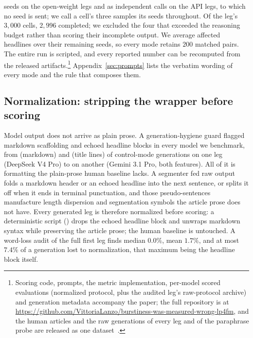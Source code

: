 \documentclass{article}
\begin{document}
seeds on the open-weight legs and as independent calls on the API legs, to which no seed is
sent; we call a cell's three samples its seeds throughout. Of the
leg's $3{,}000$ cells,
$2{,}996$ completed;
we excluded the four that exceeded the reasoning budget rather than scoring their incomplete output. We average affected
headlines over their remaining seeds, so every mode retains $200$ matched pairs. The entire run is
scripted, and every reported number can be recomputed from the released artifacts.\footnote{Scoring code, prompts, the metric implementation, per-model scored evaluations (normalized protocol, plus the audited leg's raw-protocol archive) and generation metadata accompany the paper; the full repository is at \url{https://github.com/VittoriaLanzo/burstiness-was-measured-wrong-lp4fm}, and the human articles and the raw generations of every leg and of the paraphrase probe are released as one dataset~\citep{lanzo2026dataset}.} Appendix~\ref{sec:prompts} lists the verbatim wording of every mode and the rule that composes them.

\subsection{Normalization: stripping the wrapper before scoring}
\label{sec:normalization}
Model output does not arrive as plain prose. A generation-hygiene guard flagged markdown
scaffolding and echoed headline blocks in every model we benchmark, from  (markdown) and  (title lines) of control-mode generations
on one leg (DeepSeek V4 Pro) to  on another (Gemini 3.1 Pro,
both features). All of it is formatting the
plain-prose human baseline lacks. A segmenter fed raw output folds a markdown header or an echoed headline into
the next sentence, or splits it off when it ends in terminal punctuation, and those pseudo-sentences manufacture length dispersion and segmentation symbols
the article prose does not have. Every generated leg is therefore normalized before scoring:
a deterministic script () drops the echoed
headline block and unwraps markdown syntax while preserving the article prose; the human baseline
is untouched. A word-loss audit of the full first leg finds median $0.0\%$, mean
$1.7\%$, and at most $7.4\%$ of a generation lost to normalization, that maximum being the
headline block itself.
\end{document}
